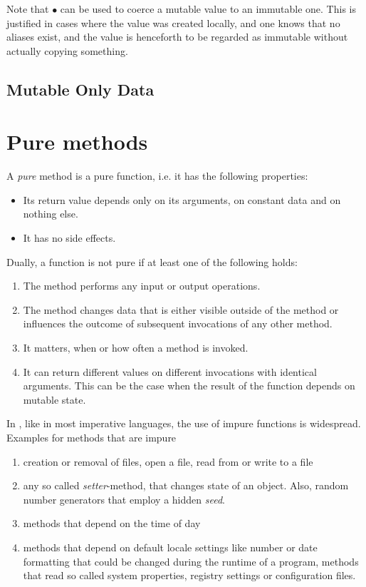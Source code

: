 Note that  $\bullet{}$   can be used to coerce a mutable value to an immutable one. This is justified in cases where the value was created locally, and one knows that no aliases exist, and the value is henceforth to be regarded as immutable without actually copying something.

\subsection{Mutable Only Data}


\section{Pure \java{} methods} \label{pure}

A \emph{pure} \java{} method is a pure function, i.e. it has the following properties:
\begin{itemize}
\item Its return value depends only on its arguments, on constant data and on nothing else.
\item It has no side effects.
\end{itemize}

Dually, a function is not pure if at least one of the following holds:
\begin{enumerate}
\item The method performs any input or output operations.
\item The method changes data that is either visible outside of the method or influences the outcome of subsequent invocations of any other method.
\item It matters, when or how often a method is invoked.
\item It can return different values on different invocations with identical arguments. 
This can be the case when the result of the function depends on mutable state.
\end{enumerate}

In \java{}, like in most imperative languages, the use of impure functions is widespread.
Examples for methods that are impure
\begin{enumerate}
\item creation or removal of files, open a file, read from or write to a file
\item any so called \emph{setter}-method, that changes state of an object. Also, random number generators that employ a hidden \emph {seed}.
\item methods that depend on the time of day
\item methods that depend on default locale settings like number or date formatting that could be changed during the runtime of a program, methods that read so called system properties, registry settings or configuration files.
\end{enumerate}

